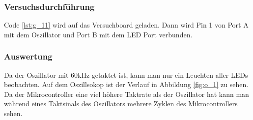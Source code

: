 \documentclass[12pt,a4paper]{article}
\begin{document}
\subsubsection*{Versuchsdurchführung}

Code \ref{lst:g_11} wird auf das Versuchboard geladen. Dann wird Pin 1 von Port A mit dem Oszillator und Port B mit dem LED Port verbunden.

\subsubsection*{Auswertung}

Da der Oszillator mit 60kHz getaktet ist, kann man nur ein Leuchten aller LEDs beobachten. Auf dem Oszillsokop ist der Verlauf in Abbildung \ref{fig:o_1} zu sehen. Da der Mikrocontroller eine viel höhere Taktrate als der Oszillator hat kann man während eines Taktsinals des Oszillators mehrere Zyklen des Mikrocontrollers sehen.
\end{document}
